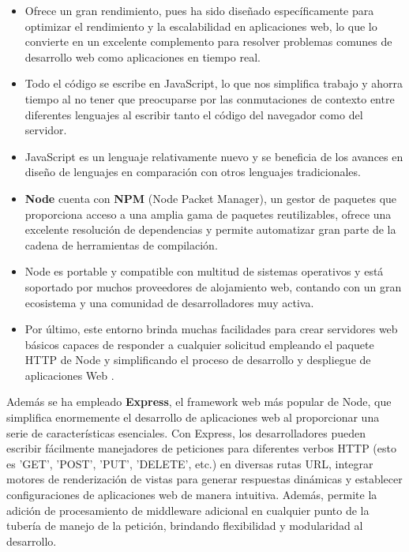 \documentclass[12pt]{article}
\begin{document}
\begin{itemize}
\item Ofrece un gran rendimiento, pues ha sido diseñado específicamente para optimizar el rendimiento y la
escalabilidad en aplicaciones web, lo que lo convierte en un excelente complemento para resolver problemas comunes de desarrollo web como aplicaciones
en tiempo real. 
\item Todo el código se escribe en JavaScript, lo que nos simplifica trabajo y ahorra tiempo al no tener que preocuparse por las conmutaciones
de contexto entre diferentes lenguajes al escribir tanto el código del navegador como del servidor. 
\item JavaScript es un lenguaje relativamente nuevo y se beneficia de los avances en diseño de lenguajes en comparación con otros lenguajes tradicionales. 
\item \textbf{Node} cuenta con \textbf{NPM} (Node Packet Manager), un gestor de paquetes que proporciona acceso a una amplia gama de paquetes reutilizables, ofrece una excelente resolución de dependencias y permite automatizar
gran parte de la cadena de herramientas de compilación. 
\item Node es portable y compatible con multitud de sistemas operativos y está soportado por muchos proveedores de alojamiento web, contando con un gran ecosistema y una comunidad de desarrolladores muy activa. 
\item Por último, este entorno brinda muchas facilidades para crear servidores web básicos capaces de responder a cualquier solicitud empleando el paquete HTTP de Node y simplificando el proceso de desarrollo y despliegue de
aplicaciones Web \cite{node}.
\end{itemize}

Además se ha empleado \textbf{Express}, el framework web más popular de Node, que simplifica enormemente el desarrollo de aplicaciones web al proporcionar
una serie de características esenciales. Con Express, los desarrolladores pueden escribir fácilmente manejadores de peticiones para diferentes 
verbos HTTP (esto es 'GET', 'POST', 'PUT', 'DELETE', etc.) en diversas rutas URL, integrar motores de renderización de vistas para generar respuestas dinámicas y establecer configuraciones de 
aplicaciones web de manera intuitiva. Además, permite la adición de procesamiento de middleware adicional en cualquier punto de la tubería de manejo de 
la petición, brindando flexibilidad y modularidad al desarrollo. \cite{node}
\end{document}
